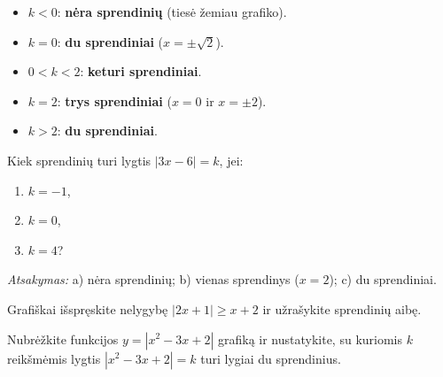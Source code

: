 \begin{itemize}
    \item $k < 0$: \textbf{nėra sprendinių} (tiesė žemiau grafiko).
    \item $k = 0$: \textbf{du sprendiniai} ($x = \pm\sqrt{2}$).
    \item $0 < k < 2$: \textbf{keturi sprendiniai}.
    \item $k = 2$: \textbf{trys sprendiniai} ($x = 0$ ir $x = \pm 2$).
    \item $k > 2$: \textbf{du sprendiniai}.
\end{itemize}

\begin{center}
\end{center}

\begin{exercise}
Kiek sprendinių turi lygtis $|3x - 6| = k$, jei:
\begin{enumerate}[label=\alph*)]
    \item $k = -1$,
    \item $k = 0$,
    \item $k = 4$?
\end{enumerate}
\textit{Atsakymas:} a) nėra sprendinių; b) vienas sprendinys ($x=2$); c) du sprendiniai.
\end{exercise}

\begin{exercise}
Grafiškai išspręskite nelygybę $|2x + 1| \geq x + 2$ ir užrašykite sprendinių aibę.
\end{exercise}

\begin{exercise}
Nubrėžkite funkcijos $y = |x^2 - 3x + 2|$ grafiką ir nustatykite, su kuriomis $k$ reikšmėmis lygtis $|x^2 - 3x + 2| = k$ turi lygiai du sprendinius.
\end{exercise}

